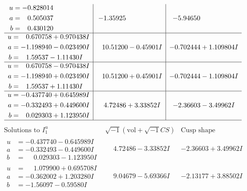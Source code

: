 \documentclass[1p]{elsarticle_modified}
\theoremstyle{definition}
\newcommand{\I}{\sqrt{-1}}
\begin{document}
$$\begin{array}{c|c|c}
\begin{aligned}
u &= -0.828014\phantom{ +0.000000I} \\
a &= \phantom{-}0.505037\phantom{ +0.000000I} \\
b &= \phantom{-}0.430120\phantom{ +0.000000I}\end{aligned}
 & -1.35925\phantom{ +0.000000I} & -5.94650\phantom{ +0.000000I} \\ \hline\begin{aligned}
u &= \phantom{-}0.670758 + 0.970438 I \\
a &= -1.198940 - 0.023490 I \\
b &= \phantom{-}1.59537 - 1.11430 I\end{aligned}
 & \phantom{-}10.51200 - 0.45901 I & -0.702444 + 1.109804 I \\ \hline\begin{aligned}
u &= \phantom{-}0.670758 - 0.970438 I \\
a &= -1.198940 + 0.023490 I \\
b &= \phantom{-}1.59537 + 1.11430 I\end{aligned}
 & \phantom{-}10.51200 + 0.45901 I & -0.702444 - 1.109804 I \\ \hline\begin{aligned}
u &= -0.437740 + 0.645989 I \\
a &= -0.332493 + 0.449600 I \\
b &= \phantom{-}0.029303 + 1.123950 I\end{aligned}
 & \phantom{-}4.72486 + 3.33852 I & -2.36603 - 3.49962 I\\
 \hline 
 \end{array}$$\newpage$$\begin{array}{c|c|c}  
\text{Solutions to }I^u_{1}& \I (\text{vol} + \sqrt{-1}CS) & \text{Cusp shape}\\
 \hline 
\begin{aligned}
u &= -0.437740 - 0.645989 I \\
a &= -0.332493 - 0.449600 I \\
b &= \phantom{-}0.029303 - 1.123950 I\end{aligned}
 & \phantom{-}4.72486 - 3.33852 I & -2.36603 + 3.49962 I \\ \hline\begin{aligned}
u &= \phantom{-}1.079900 + 0.695708 I \\
a &= -0.362002 + 1.203280 I \\
b &= -1.56097 - 0.59580 I\end{aligned}
 & \phantom{-}9.04679 - 5.69366 I & -2.13177 + 3.88502 I \\ \hline\begin{aligned}

\end{aligned}
\end{array}$$
\end{document}
